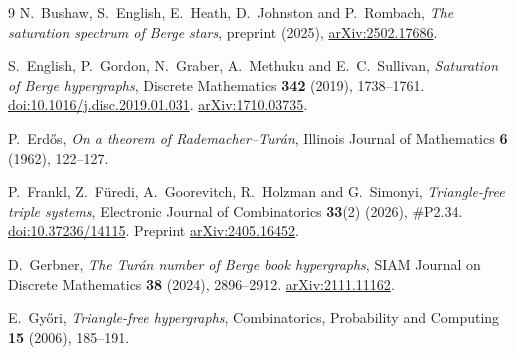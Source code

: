 \documentclass[11pt]{article}
\theoremstyle{remark}
\begin{document}
\begin{thebibliography}{9}
N.~Bushaw, S.~English, E.~Heath, D.~Johnston and P.~Rombach,
\emph{The saturation spectrum of Berge stars}, preprint (2025),
\href{https://arxiv.org/abs/2502.17686}{arXiv:2502.17686}.

S.~English, P.~Gordon, N.~Graber, A.~Methuku and E.~C.~Sullivan,
\emph{Saturation of Berge hypergraphs}, Discrete Mathematics \textbf{342}
(2019), 1738--1761.
\href{https://doi.org/10.1016/j.disc.2019.01.031}{doi:10.1016/j.disc.2019.01.031}.
\href{https://arxiv.org/abs/1710.03735}{arXiv:1710.03735}.

P.~Erd\H{o}s, \emph{On a theorem of Rademacher--Tur\'an}, Illinois Journal
of Mathematics \textbf{6} (1962), 122--127.

P.~Frankl, Z.~F\"uredi, A.~Goorevitch, R.~Holzman and G.~Simonyi,
\emph{Triangle-free triple systems}, Electronic Journal of Combinatorics
\textbf{33}(2) (2026), \#P2.34.
\href{https://doi.org/10.37236/14115}{doi:10.37236/14115}.
Preprint \href{https://arxiv.org/abs/2405.16452}{arXiv:2405.16452}.

D.~Gerbner, \emph{The Tur\'an number of Berge book hypergraphs}, SIAM
Journal on Discrete Mathematics \textbf{38} (2024), 2896--2912.
\href{https://arxiv.org/abs/2111.11162}{arXiv:2111.11162}.

E.~Gy\H{o}ri, \emph{Triangle-free hypergraphs}, Combinatorics,
Probability and Computing \textbf{15} (2006), 185--191.
\end{thebibliography}
\end{document}
